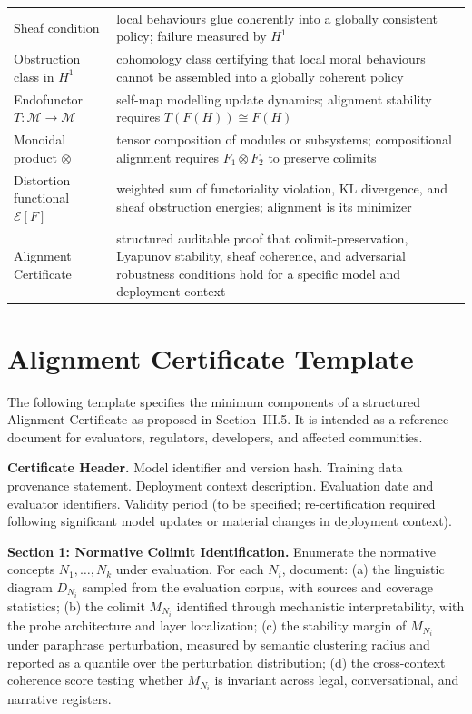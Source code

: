 \documentclass[12pt]{article}
\theoremstyle{definition}
\begin{document}
\begin{tabular}{@{}p{}p{}@{}}
Sheaf condition & local behaviours glue coherently into a globally consistent
  policy; failure measured by $H^1$ \\[3pt]
Obstruction class in $H^1$ & cohomology class certifying that local moral
  behaviours cannot be assembled into a globally coherent policy \\[3pt]
Endofunctor $T : \mathcal{M} \to \mathcal{M}$ & self-map modelling update
  dynamics; alignment stability requires $T(F(H)) \cong F(H)$ \\[3pt]
Monoidal product $\otimes$ & tensor composition of modules or subsystems;
  compositional alignment requires $F_1 \otimes F_2$ to preserve colimits \\[3pt]
Distortion functional $\mathcal{E}[F]$ & weighted sum of functoriality
  violation, KL divergence, and sheaf obstruction energies; alignment is
  its minimizer \\[3pt]
Alignment Certificate & structured auditable proof that colimit-preservation,
  Lyapunov stability, sheaf coherence, and adversarial robustness conditions
  hold for a specific model and deployment context \\[3pt]
\bottomrule
\end{tabular}

\section{Alignment Certificate Template}
\label{app:certificate}

The following template specifies the minimum components of a structured
Alignment Certificate as proposed in Section~III.5. It is intended as a
reference document for evaluators, regulators, developers, and affected
communities.

\medskip
\noindent\textbf{Certificate Header.} Model identifier and version hash.
Training data provenance statement. Deployment context description.
Evaluation date and evaluator identifiers. Validity period (to be specified;
re-certification required following significant model updates or material
changes in deployment context).

\medskip
\noindent\textbf{Section 1: Normative Colimit Identification.}
Enumerate the normative concepts $N_1, \ldots, N_k$ under evaluation.
For each $N_i$, document: (a) the linguistic diagram $D_{N_i}$ sampled from
the evaluation corpus, with sources and coverage statistics; (b) the colimit
$M_{N_i}$ identified through mechanistic interpretability, with the
probe architecture and layer localization; (c) the stability margin of $M_{N_i}$
under paraphrase perturbation, measured by semantic clustering radius and
reported as a quantile over the perturbation distribution; (d) the
cross-context coherence score testing whether $M_{N_i}$ is invariant across
legal, conversational, and narrative registers.
\end{document}

